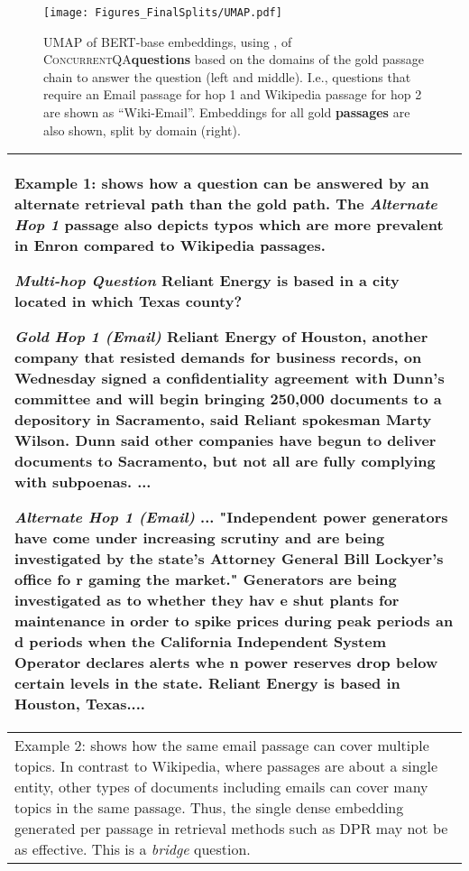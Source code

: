 \documentclass{article}
\newcommand{\blue}[1]{{\color{blue}#1}}
\newcommand{\datasetname}{\textsc{ConcurrentQA}\xspace}
\begin{document}
\begin{figure*}[t!]
    \centering
    \texttt{[image: Figures\_FinalSplits/UMAP.pdf]}
    \caption[width=0.85\linewidth]{UMAP of BERT-base  
    embeddings, using \citet{reimers-2019-sentence-bert}, of \datasetname \textbf{questions} based on the domains of the gold passage chain to answer the question (left and middle). I.e., questions that require an Email passage for hop 1 and Wikipedia passage for hop 2 are shown as ``Wiki-Email''. Embeddings for all gold \textbf{passages} are also shown, split by domain (right).}
    \label{fig:umap}
\end{figure*}


\begin{table*}[t]
\begin{tabular}{p{15cm}}
\toprule
\blue{Example 1: shows how a question can be answered by an alternate retrieval path than the gold path. The \textit{Alternate Hop 1} passage also depicts typos which are more prevalent in Enron compared to Wikipedia passages.}
\newline

\textit{Multi-hop Question} Reliant Energy is based in a city located in which Texas county? \newline

\textit{Gold Hop 1 (Email)} \textbf{Reliant Energy of Houston}, another company that resisted demands for business records, on Wednesday signed a confidentiality agreement with Dunn's committee and will begin bringing 250,000 documents to a depository in Sacramento, said Reliant spokesman Marty Wilson. Dunn said other companies have begun to deliver documents to Sacramento, but not all are fully complying with subpoenas. ...\newline

\textit{Alternate Hop 1 (Email)} ... "Independent power generators have come under increasing scrutiny and are being investigated by the state's Attorney General Bill Lockyer's office fo r gaming the market." Generators are being investigated as to whether they hav e shut plants for maintenance in order to spike prices during peak periods an d periods when the California Independent System Operator declares alerts whe n power reserves drop below certain levels in the state. \textbf{Reliant Energy is based in Houston, Texas}....
\\ 
\midrule
\blue{Example 2: shows how the same email passage can cover multiple topics.} In contrast to Wikipedia, where passages are about a single entity, other types of documents including emails can cover many topics in the same passage. Thus, the single dense embedding generated per passage in retrieval methods such as DPR may not be as effective. This is a \textit{bridge} question. \newline
 

\end{tabular}
\end{table*}
\end{document}

